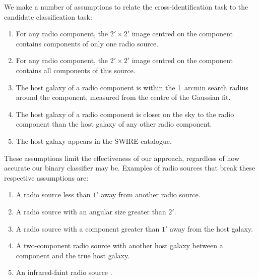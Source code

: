 \documentclass[11pt, a4paper]{book}
\begin{document}
    We make a number of assumptions to relate the cross-identification task to
    the candidate classification task:
    \begin{enumerate}
      \item {For any radio component, the $2' \times 2'$ image centred on the component contains components of only one radio source.}
      \item {For any radio component, the $2' \times 2'$ image centred on the component contains all components of this source.}
      \item The host galaxy of a radio component is within the 1~arcmin {search radius around the component, measured from the centre of the Gaussian fit}.
      \item The host galaxy of a radio component is closer on the sky to the
        radio component than the host galaxy of any other radio component.
      \item The host galaxy appears in the SWIRE catalogue.
    \end{enumerate}
    These assumptions limit the effectiveness of our approach, regardless of
    how accurate our binary classifier may be. {Examples of radio sources that break these respective assumptions are:}
    \begin{enumerate}
      \item {A radio source less than $1'$ away from another radio source.}
      \item {A radio source with an angular size greater than $2'$.}
      \item {A radio source with a component greater than $1'$ away from the host galaxy.}
      \item {A two-component radio source with another host galaxy between a component and the true host galaxy.}
      \item {An infrared-faint radio source \citep[as in][]{collier14irfaint}.}
    \end{enumerate}
\end{document}
